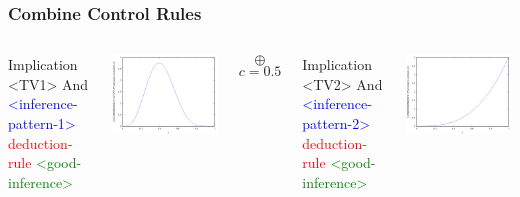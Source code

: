 \documentclass{beamer}
\begin{document}
\begin{frame}[fragile]
  \frametitle{Combine Control Rules}

\begin{columns}

\column{1.1in}

{\tiny
\begin{semiverbatim}
Implication <TV1>
  And
    \textcolor{blue}{<inference-pattern-1>}
    \textcolor{red}{deduction-rule}
  \textcolor{green}{<good-inference>}
\end{semiverbatim}
}

\includegraphics[scale=0.2]{images/Beta_4_6_alpha.png}

\column{0.4in}
\begin{center}
  $$\oplus$$
  {\tiny $$c=0.5$$}
\end{center}

\column{1.3in}

{\tiny
\begin{semiverbatim}
Implication <TV2>
  And
    \textcolor{blue}{<inference-pattern-2>}
    \textcolor{red}{deduction-rule}
  \textcolor{green}{<good-inference>}
\end{semiverbatim}
}

\includegraphics[scale=0.2]{images/Beta_3_0_alpha.png}


\end{columns}
\end{frame}
\end{document}
